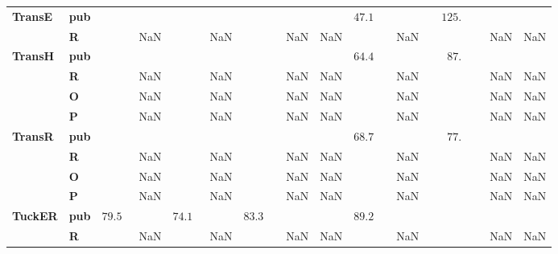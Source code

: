 \begin{tabular}{llrrrrrrr}
\textbf{TransE} & \textbf{pub} &                             &                             &                              &             &  $47.1\phantom{0 \pm 00.00}$ &  $\phantom{00}125.\phantom{00 \pm 00.00}$ &          \\
       & \textbf{R} &                         NaN &                         NaN &                          NaN &         NaN &                          NaN &                                       NaN &      NaN \\\midrule
\textbf{TransH} & \textbf{pub} &                             &                             &                              &             &  $64.4\phantom{0 \pm 00.00}$ &  $\phantom{000}87.\phantom{00 \pm 00.00}$ &          \\
       & \textbf{R} &                         NaN &                         NaN &                          NaN &         NaN &                          NaN &                                       NaN &      NaN \\
       & \textbf{O} &                         NaN &                         NaN &                          NaN &         NaN &                          NaN &                                       NaN &      NaN \\
       & \textbf{P} &                         NaN &                         NaN &                          NaN &         NaN &                          NaN &                                       NaN &      NaN \\\midrule
\textbf{TransR} & \textbf{pub} &                             &                             &                              &             &  $68.7\phantom{0 \pm 00.00}$ &  $\phantom{000}77.\phantom{00 \pm 00.00}$ &          \\
       & \textbf{R} &                         NaN &                         NaN &                          NaN &         NaN &                          NaN &                                       NaN &      NaN \\
       & \textbf{O} &                         NaN &                         NaN &                          NaN &         NaN &                          NaN &                                       NaN &      NaN \\
       & \textbf{P} &                         NaN &                         NaN &                          NaN &         NaN &                          NaN &                                       NaN &      NaN \\\midrule
\textbf{TuckER} & \textbf{pub} &  $79.5\phantom{0 \pm 0.00}$ &  $74.1\phantom{0 \pm 0.00}$ &  $83.3\phantom{0 \pm 00.00}$ &             &  $89.2\phantom{0 \pm 00.00}$ &                                           &          \\
       & \textbf{R} &                         NaN &                         NaN &                          NaN &         NaN &                          NaN &                                       NaN &      NaN \\
\bottomrule
\end{tabular}

